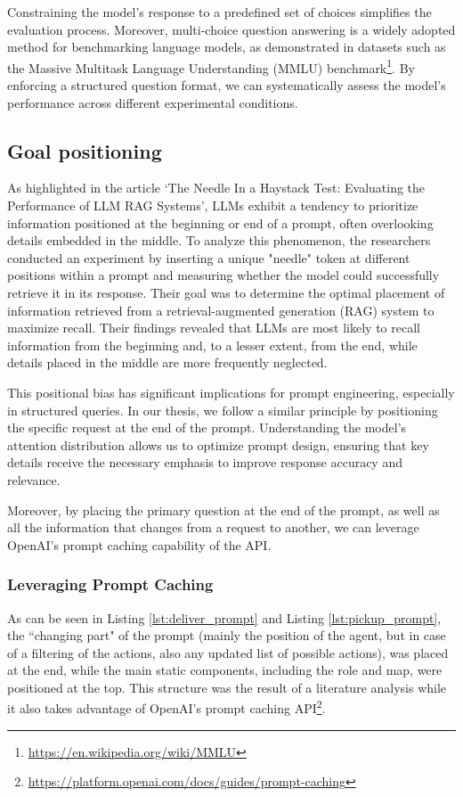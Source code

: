 Constraining the model's response to a predefined set of choices simplifies the
evaluation process. Moreover, multi-choice question answering is a widely
adopted method for benchmarking language models, as demonstrated in datasets such
as the Massive Multitask Language Understanding (MMLU) benchmark\footnote{\url{https://en.wikipedia.org/wiki/MMLU}}.
By enforcing a structured question format, we can systematically assess the
model's performance across different experimental conditions.

\subsection{Goal positioning}

As highlighted in the article `The Needle In a Haystack Test: Evaluating the Performance
of LLM RAG Systems'\cite{needleRAG}, LLMs exhibit a tendency to prioritize
information positioned at the beginning or end of a prompt, often overlooking details
embedded in the middle. To analyze this phenomenon, the researchers conducted an
experiment by inserting a unique "needle" token at different positions within a prompt
and measuring whether the model could successfully retrieve it in its response.
Their goal was to determine the optimal placement of information retrieved from
a retrieval-augmented generation (RAG) system to maximize recall. Their findings
revealed that LLMs are most likely to recall information from the beginning and,
to a lesser extent, from the end, while details placed in the middle are more
frequently neglected.

This positional bias has significant implications for prompt engineering, especially
in structured queries. In our thesis, we follow a similar principle by positioning
the specific request at the end of the prompt. Understanding the model's
attention distribution allows us to optimize prompt design, ensuring that key details
receive the necessary emphasis to improve response accuracy and relevance.

Moreover, by placing the primary question at the end of the prompt, as well as all
the information that changes from a request to another, we can leverage OpenAI's
prompt caching capability of the API.

\subsubsection{Leveraging Prompt Caching}
As can be seen in Listing \ref{lst:deliver_prompt} and Listing
\ref{lst:pickup_prompt}, the ``changing part" of the prompt (mainly the position
of the agent, but in case of a filtering of the actions, also any updated list of
possible actions), was placed at the end, while the main static components, including
the role and map, were positioned at the top. This structure was the result of a
literature analysis while it also takes advantage of OpenAI's prompt caching API\footnote{\url{https://platform.openai.com/docs/guides/prompt-caching}}.

